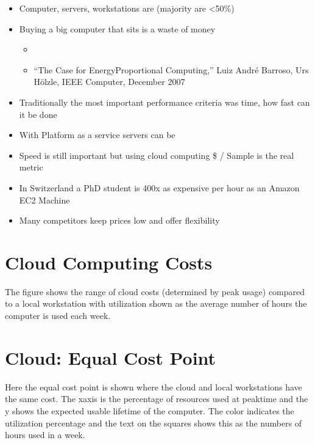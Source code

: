 \documentclass[letterpaper,10pt,english]{sphinxmanual}
\begin{document}
\begin{itemize}
\item {} 
\sphinxAtStartPar
Computer, servers, workstations are  (majority are \textless{}50\%)

\item {} 
\sphinxAtStartPar
Buying a big computer that sits  is a waste of money
\begin{itemize}
\item {} 
\sphinxAtStartPar
{}

\item {} 
\sphinxAtStartPar
“The Case for Energy\sphinxhyphen{}Proportional Computing,” Luiz André Barroso, Urs Hölzle, IEEE Computer, December 2007

\end{itemize}

\item {} 
\sphinxAtStartPar
Traditionally the most important performance criteria was time, how fast can it be done

\item {} 
\sphinxAtStartPar
With Platform as a service servers can be 

\item {} 
\sphinxAtStartPar
Speed is still important but using cloud computing \$ / Sample is the real metric

\item {} 
\sphinxAtStartPar
In Switzerland a PhD student is 400x as expensive per hour as an Amazon EC2 Machine

\item {} 
\sphinxAtStartPar
Many competitors keep prices low and offer flexibility

\end{itemize}




\section{Cloud Computing Costs}
\label{\detokenize{01-Introduction:cloud-computing-costs}}
\sphinxAtStartPar
The figure shows the range of cloud costs (determined by peak usage) compared to a local workstation with utilization shown as the average number of hours the computer is used each week.


\section{Cloud: Equal Cost Point}
\label{\detokenize{01-Introduction:cloud-equal-cost-point}}
\sphinxAtStartPar
Here the equal cost point is shown where the cloud and local workstations have the same cost. The x\sphinxhyphen{}axis is the percentage of resources used at peak\sphinxhyphen{}time and the y shows the expected usable lifetime of the computer. The color indicates the utilization percentage and the text on the squares shows this as the numbers of hours used in a week.
\end{document}

